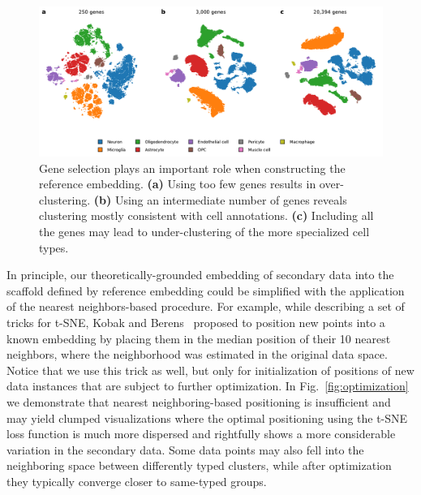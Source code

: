 \documentclass[runningheads]{llncs}
\begin{document}
\begin{figure}[htbp]
\includegraphics[width=\textwidth]{figures/hrvatin_embedding_tsne_genes.pdf}
\caption{Gene selection plays an important role when constructing the reference
embedding. {\bf (a)} Using too few genes results in over-clustering. {\bf (b)}
Using an intermediate number of genes reveals clustering mostly consistent with
cell annotations. {\bf (c)} Including all the genes may lead to
under-clustering of the more specialized cell types.}
\label{fig:gene_selection}
\end{figure}

In principle, our theoretically-grounded embedding of secondary data into the
scaffold defined by reference embedding could be simplified with the
application of the nearest neighbors-based procedure. For example, while
describing a set of tricks for t-SNE, Kobak and Berens~\cite{art_of_using_tsne}
proposed to position new points into a known embedding by placing them in the
median position of their 10 nearest neighbors, where the neighborhood was
estimated in the original data space. Notice that we use this trick as well,
but only for initialization of positions of new data instances that are subject
to further optimization. In Fig.~\ref{fig:optimization} we demonstrate that
nearest neighboring-based positioning is insufficient and may yield clumped
visualizations where the optimal positioning using the t-SNE loss function is
much more dispersed and rightfully shows a more considerable variation in the
secondary data. Some data points may also fell into the neighboring space
between differently typed clusters, while after optimization they typically
converge closer to same-typed groups.
\end{document}
